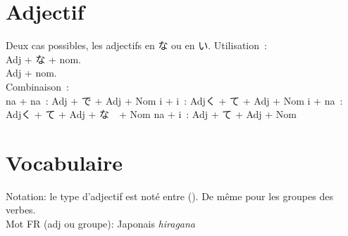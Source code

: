 \documentclass{article}
\begin{document}
\section{Adjectif}
\begin{CJK}{UTF8}{min}
Deux cas possibles, les adjectifs en な ou en い.
Utilisation~:\\
Adj + な + nom. \\
Adj + nom. \\

Combinaison~:\\
na + na~: Adj + で + Adj + Nom
i + i~: Adjく + て + Adj + Nom
i + na~: Adjく + て + Adj + な　+ Nom
na + i~: Adj	+ て + Adj + Nom


\end{CJK}
\newpage
\section{Vocabulaire}
Notation: le type d'adjectif est noté entre (). De même pour les groupes des verbes.\\
Mot FR (adj ou groupe): Japonais \textit{hiragana}
\end{document}
